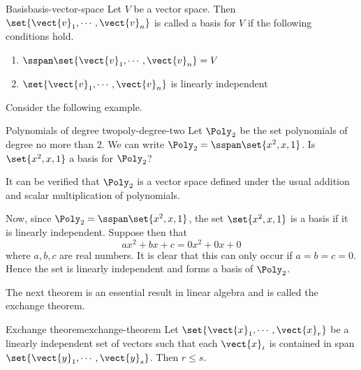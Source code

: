 \begin{definition}{Basis}{basis-vector-space}
Let $V$ be a vector space. Then $\set{\vect{v}_{1},\cdots ,\vect{v}_{n}}$ is called a basis for $V$ if the following conditions hold.
\begin{enumerate}
\item
$\sspan\set{\vect{v}_{1},\cdots ,\vect{v}_{n}} = V$
\item
$\set{\vect{v}_{1},\cdots ,\vect{v}_{n}}$ is linearly independent
\end{enumerate}
\end{definition}

Consider the following example.

\begin{example}{Polynomials of degree two}{poly-degree-two}
Let $\Poly_2$ be the set polynomials of degree no more than 2. We can write
$\Poly_2=\sspan\set{x^{2}, x, 1}$. Is $\set{x^{2}, x, 1} $ a
basis for $\Poly_2$?
\end{example}

\begin{solution}
It can be verified that $\Poly_2$ is a vector space defined under the usual addition and scalar multiplication of polynomials. 

Now, since $\Poly_2=\sspan\set{x^{2},x, 1}$, the set  $\set{x^{2}, x, 1} $ is a basis if it is linearly independent. Suppose then that 
\begin{equation*}
ax^{2}+bx+c=0x^2 + 0x + 0 
\end{equation*}
where $a,b,c$ are real numbers. It is clear that this can only occur if $a=b=c=0$. Hence the set is linearly independent and forms a basis of $\Poly_2$.
\end{solution}

The next theorem is an essential result in linear algebra and is called the exchange theorem.

\begin{theorem}{Exchange theorem}{exchange-theorem}
Let $\set{\vect{x}_{1},\cdots ,\vect{x}_{r}} $
be a linearly independent set of vectors such that each $\vect{x}_{i}$ is
contained in span$\set{\vect{y}_{1},\cdots ,\vect{y}_{s}}$. Then $
r\leq s$.
\end{theorem}

